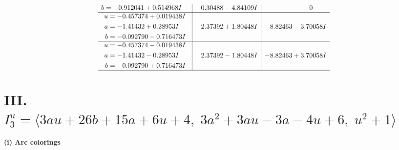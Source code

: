 \documentclass[1p]{elsarticle_modified}
\theoremstyle{definition}
\begin{document}
$$\begin{array}{c|c|c}
\begin{aligned}
b &= \phantom{-}0.912041 + 0.514968 I\end{aligned}
 & \phantom{-}0.30488 - 4.84109 I & \phantom{-0.000000 } 0 \\ \hline\begin{aligned}
u &= -0.457374 + 0.019438 I \\
a &= -1.41432 + 0.28953 I \\
b &= -0.092790 - 0.716473 I\end{aligned}
 & \phantom{-}2.37392 + 1.80448 I & -8.82463 - 3.70058 I \\ \hline\begin{aligned}
u &= -0.457374 - 0.019438 I \\
a &= -1.41432 - 0.28953 I \\
b &= -0.092790 + 0.716473 I\end{aligned}
 & \phantom{-}2.37392 - 1.80448 I & -8.82463 + 3.70058 I\\
 \hline 
 \end{array}$$\newpage\newpage\renewcommand{\arraystretch}{1}
\centering \section*{III. $I^u_{3}= \langle 3 a u+26 b+15 a+6 u+4,\;3 a^2+3 a u-3 a-4 u+6,\;u^2+1 \rangle$}
\flushleft \textbf{(i) Arc colorings}\\
\end{document}
